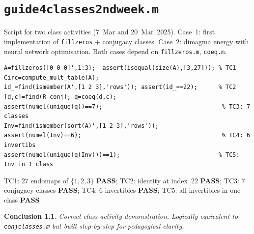 \documentclass[12pt,a4paper]{report}
\newcommand{\mf}[1]{\texttt{#1}}
\newcommand{\PASS}{\textcolor{green!60!black}{\textbf{PASS}}}
\newtheorem{concl}{Conclusion}[chapter]
\begin{document}
\chapter{\mf{guide4classes2ndweek.m}}
\begin{tcolorbox}[Abox,title=Analysis]
Script for two class activities (7~Mar and 20~Mar~2025). Case~1: first implementation of \mf{fillzeros} + conjugacy classes. Case~2: dimagma energy with neural network optimisation. Both cases depend on \mf{fillzeros.m}, \mf{coeq.m}.
\end{tcolorbox}
\begin{lstlisting}[caption={Tests for guide4classes2ndweek.m -- case 1}]
A=fillzeros([0 0 0]',1:3);  assert(isequal(size(A),[3,27])); % TC1
Circ=compute_mult_table(A);
id_=find(ismember(A',[1 2 3],'rows')); assert(id_==22);      % TC2
[d,c]=find(R_conj); q=coeq(d,c);
assert(numel(unique(q))==7);                                  % TC3: 7 classes
Inv=find(ismember(sort(A)',[1 2 3],'rows'));
assert(numel(Inv)==6);                                        % TC4: 6 invertibs
assert(numel(unique(q(Inv)))==1);                            % TC5: Inv in 1 class
\end{lstlisting}
\begin{tcolorbox}[Pbox,title=TC1--TC5 -- All pass]
TC1: 27 endomaps of $\{1,2,3\}$ \PASS; TC2: identity at index~22 \PASS; TC3: 7 conjugacy classes \PASS; TC4: 6 invertibles \PASS; TC5: all invertibles in one class \PASS
\end{tcolorbox}
\begin{concl}
Correct class-activity demonstration. Logically equivalent to \mf{conjclasses.m} but built step-by-step for pedagogical clarity.
\end{concl}

\end{document}
